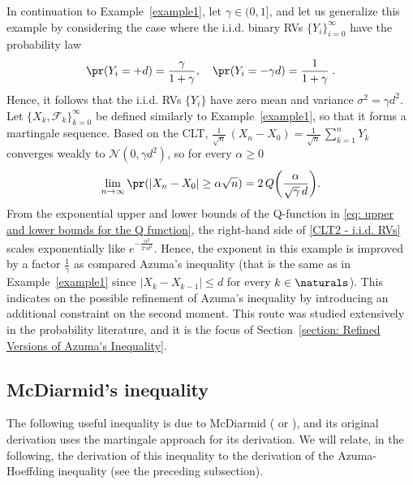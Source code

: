 \documentclass{article}
\theoremstyle{plain}
\begin{document}
\begin{example}
In continuation to Example~\ref{example1}, let $\gamma \in (0,1]$,
and let us generalize this example by considering the case where the
i.i.d. binary RVs $\{Y_i\}_{i=0}^{\infty}$ have the
probability law
$$ \pr(Y_i = +d) = \frac{\gamma}{1+\gamma}, \quad \pr(Y_i =
-\gamma d) = \frac{1}{1+\gamma} \; .$$ Hence, it follows that the
i.i.d. RVs $\{Y_i\}$ have zero mean and variance $\sigma^2 =
\gamma d^2$. Let $\{X_k,
\mathcal{F}_k\}_{k=0}^{\infty}$ be defined similarly to
Example~\ref{example1}, so that it forms a martingale sequence.
Based on the CLT, $\frac{1}{\sqrt{n}} \, (X_n - X_0) =
\frac{1}{\sqrt{n}} \, \sum_{k=1}^n Y_k$ converges weakly to
$\mathcal{N}(0, \gamma d^2)$, so for every $\alpha \geq 0$
\begin{equation}
\lim_{n \rightarrow \infty} \pr( | X_n - X_0 | \geq \alpha
\sqrt{n})= 2 \, Q\biggl(\frac{\alpha}{\sqrt{\gamma} \, d}\biggr).
\label{CLT2 - i.i.d. RVs}
\end{equation}
From the exponential upper and lower bounds of the Q-function in
\eqref{eq: upper and lower bounds for the Q function}, the
right-hand side of \eqref{CLT2 - i.i.d. RVs} scales exponentially
like $e^{-\frac{\alpha^2}{2 \gamma d^2}}$. Hence, the exponent in
this example is improved by a factor $\frac{1}{\gamma}$ as
compared Azuma's inequality (that is the same as in
Example~\ref{example1} since $|X_k - X_{k-1}| \leq d$ for every $k
\in \naturals$). This indicates on the possible refinement of
Azuma's inequality by introducing an additional constraint on the
second moment. This route was studied extensively in the
probability literature, and it is the focus of
Section~\ref{section: Refined Versions of Azuma's Inequality}.
\label{example2}
\end{example}

\subsection{McDiarmid's inequality}
\label{subsection: McDiarmid's inequality}
The following useful inequality is due to McDiarmid
(\cite[Theorem~3.1]{McDiarmid_1997} or
\cite{McDiarmid_bounded_differences_Martingales_1989}),
and its original derivation uses the martingale approach for its
derivation. We will relate, in the following, the derivation of this
inequality to the derivation of the Azuma-Hoeffding inequality
(see the preceding subsection).
\end{document}
